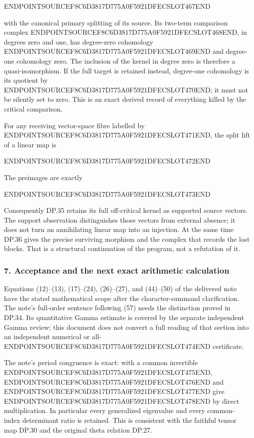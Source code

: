 ENDPOINTSOURCEF8C6D3817D775A0F5921DFECSLOT467END

with the canonical primary splitting of its source. Its two-term comparison complex ENDPOINTSOURCEF8C6D3817D775A0F5921DFECSLOT468END, in degrees zero and one, has degree-zero cohomology ENDPOINTSOURCEF8C6D3817D775A0F5921DFECSLOT469END and degree-one cohomology zero. The inclusion of the kernel in degree zero is therefore a quasi-isomorphism. If the full target is retained instead, degree-one cohomology is its quotient by ENDPOINTSOURCEF8C6D3817D775A0F5921DFECSLOT470END; it must not be silently set to zero. This is an exact derived record of everything killed by the critical comparison.

For any receiving vector-space fibre labelled by ENDPOINTSOURCEF8C6D3817D775A0F5921DFECSLOT471END, the split lift of a linear map is

ENDPOINTSOURCEF8C6D3817D775A0F5921DFECSLOT472END

The preimages are exactly

ENDPOINTSOURCEF8C6D3817D775A0F5921DFECSLOT473END

Consequently DP.35 retains its full off-critical kernel as supported source vectors. The support observation distinguishes those vectors from external absence; it does not turn an annihilating linear map into an injection. At the same time DP.36 gives the precise surviving morphism and the complex that records the lost blocks. That is a structural continuation of the program, not a refutation of it.

\subsubsection{7. Acceptance and the next exact arithmetic calculation}\label{endpoint-purity_review--acceptance-and-the-next-exact-arithmetic-calculation}

Equations (12)--(13), (17)--(24), (26)--(27), and (44)--(50) of the delivered note have the stated mathematical scope after the character-summand clarification. The note's full-order sentence following (57) needs the distinction proved in DP.34. Its quantitative Gamma estimate is covered by the separate independent Gamma review; this document does not convert a full reading of that section into an independent numerical or all-ENDPOINTSOURCEF8C6D3817D775A0F5921DFECSLOT474END certificate.

The note's period congruence is exact: with a common invertible ENDPOINTSOURCEF8C6D3817D775A0F5921DFECSLOT475END, ENDPOINTSOURCEF8C6D3817D775A0F5921DFECSLOT476END and ENDPOINTSOURCEF8C6D3817D775A0F5921DFECSLOT477END give ENDPOINTSOURCEF8C6D3817D775A0F5921DFECSLOT478END by direct multiplication. In particular every generalized eigenvalue and every common-index determinant ratio is retained. This is consistent with the faithful tensor map DP.30 and the original theta relation DP.27.

